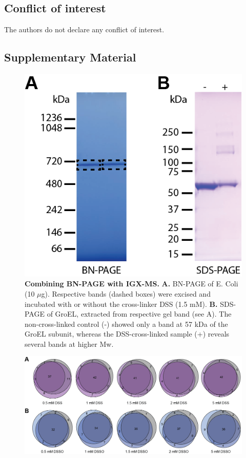 \subsection*{Conflict of interest}
The authors do not declare any conflict of interest.
\clearpage
\begin{subappendices}
	\section{Supplementary Material}
	\begin{figure}[hbt]
		\center
		\includegraphics[]{Chapter.2/Figures/SI_Figure1.png}
		\caption{\textbf{Combining BN-PAGE with IGX-MS.} \textbf{A.} BN-PAGE of E. Coli (10 $\mu$g). Respective bands (dashed boxes) were excised and incubated with or without the cross-linker DSS (1.5 mM). \textbf{B.} SDS-PAGE of GroEL, extracted from respective gel band (see A). The non-cross-linked control (-) showed only a band at 57 kDa of the GroEL subunit, whereas the DSS-cross-linked sample (+) reveals several bands at higher Mw.}
		\label{fig:ch2_app_fig1}
	\end{figure}
	\vspace{1cm}
	\begin{figure}[hbt]
		\center
		\includegraphics[]{Chapter.2/Figures/SI_Figure2.png}

\end{figure}
\end{subappendices}
